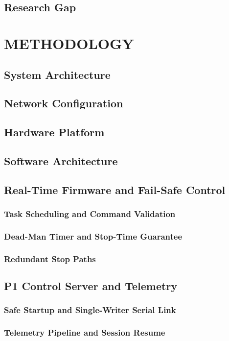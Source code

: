 \section{Research Gap}

\chapter{METHODOLOGY}
\section{System Architecture}
\section{Network Configuration}
\section{Hardware Platform}
\section{Software Architecture}
\section{Real-Time Firmware and Fail-Safe Control}
\subsection{Task Scheduling and Command Validation}
\subsection{Dead-Man Timer and Stop-Time Guarantee}
\subsection{Redundant Stop Paths}
\section{P1 Control Server and Telemetry}
\subsection{Safe Startup and Single-Writer Serial Link}
\subsection{Telemetry Pipeline and Session Resume}
